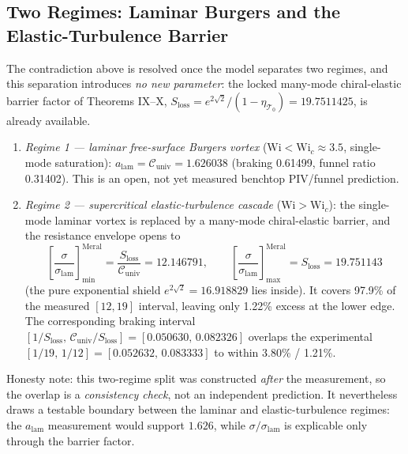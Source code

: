 \documentclass[12pt,a4paper]{article}
\begin{document}
\subsection*{Two Regimes: Laminar Burgers and the Elastic-Turbulence Barrier}
The contradiction above is resolved once the model separates two regimes,
and this separation introduces \emph{no new parameter}: the locked
many-mode chiral-elastic barrier factor of Theorems IX--X,
$S_{\mathrm{loss}}=e^{2\sqrt{2}}/(1-\eta_{\mathcal{T}_0})=19.7511425$,
is already available.
\begin{enumerate}
    \item \textit{Regime 1 --- laminar free-surface Burgers vortex}
    ($\mathrm{Wi}<\mathrm{Wi}_c\approx 3.5$, single-mode saturation):
    $a_{\mathrm{lam}}=\mathcal{C}_{\mathrm{univ}}=1.626038$
    (braking 0.61499, funnel ratio 0.31402). This is an open, not yet
    measured benchtop PIV/funnel prediction.
    \item \textit{Regime 2 --- supercritical elastic-turbulence cascade}
    ($\mathrm{Wi}>\mathrm{Wi}_c$): the single-mode laminar vortex is
    replaced by a many-mode chiral-elastic barrier, and the resistance
    envelope opens to
    \begin{equation}
    \left[\frac{\sigma}{\sigma_{\mathrm{lam}}}\right]_{\min}^{\mathrm{Meral}}
    =\frac{S_{\mathrm{loss}}}{\mathcal{C}_{\mathrm{univ}}}=12.146791,
    \qquad
    \left[\frac{\sigma}{\sigma_{\mathrm{lam}}}\right]_{\max}^{\mathrm{Meral}}
    =S_{\mathrm{loss}}=19.751143
    \end{equation}
    (the pure exponential shield $e^{2\sqrt{2}}=16.918829$ lies inside).
    It covers 97.9\% of the measured $[12,19]$ interval, leaving only 1.22\%
    excess at the lower edge. The corresponding braking interval
    $[1/S_{\mathrm{loss}},\,\mathcal{C}_{\mathrm{univ}}/S_{\mathrm{loss}}]
    =[0.050630,\,0.082326]$ overlaps the experimental $[1/19,\,1/12]
    =[0.052632,\,0.083333]$ to within 3.80\% / 1.21\%.
\end{enumerate}
Honesty note: this two-regime split was constructed \emph{after} the
measurement, so the overlap is a \emph{consistency check}, not an
independent prediction. It nevertheless draws a testable boundary between
the laminar and elastic-turbulence regimes: the $a_{\mathrm{lam}}$
measurement would support $1.626$, while $\sigma/\sigma_{\mathrm{lam}}$
is explicable only through the barrier factor.
\end{document}
